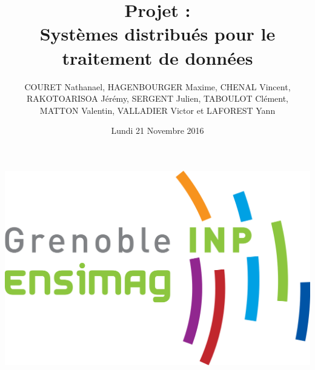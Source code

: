 \documentclass{article}
\title{\textbf{Projet : \\Systèmes distribués pour le traitement de données}}
\author{COURET Nathanael, HAGENBOURGER Maxime, CHENAL Vincent, \\ RAKOTOARISOA Jérémy, SERGENT Julien, TABOULOT Clément, \\ MATTON Valentin, VALLADIER Victor et LAFOREST Yann}
\date{Lundi 21 Novembre 2016}
\begin{document}
\maketitle

\centerline{\includegraphics[scale=0.25]{pics/logo.png}}

\pagebreak

\tableofcontents

\pagebreak


\end{document}
